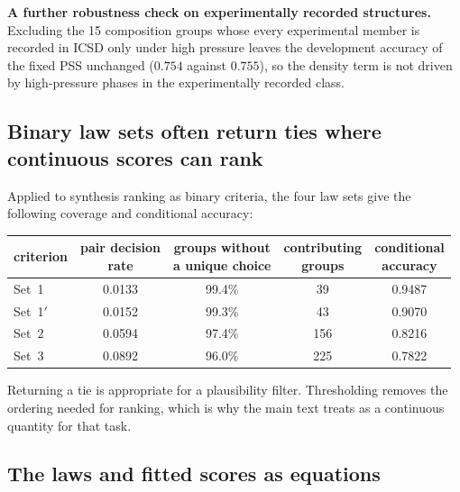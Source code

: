 \textbf{A further robustness check on experimentally recorded structures.} Excluding the 15
composition groups whose every experimental member is recorded in ICSD only
under high pressure leaves the development accuracy of the fixed PSS
unchanged ($0.754$ against $0.755$), so the density term is not driven by
high-pressure phases in the experimentally recorded class.

\subsection{Binary law sets often return ties where continuous scores can rank}

Applied to synthesis ranking as binary criteria, the four law sets give the following
coverage and conditional accuracy:

\begin{center}
\begin{tabular}{lcccc}
\hline
criterion & \shortstack{pair decision\\rate} & \shortstack{groups without\\a unique choice} &
\shortstack{contributing\\groups} & \shortstack{conditional\\accuracy} \\
\hline
Set~1 & 0.0133 & 99.4\% & 39 & 0.9487 \\
Set~1$'$ & 0.0152 & 99.3\% & 43 & 0.9070 \\
Set~2 & 0.0594 & 97.4\% & 156 & 0.8216 \\
Set~3 & 0.0892 & 96.0\% & 225 & 0.7822 \\
\hline
\end{tabular}
\end{center}

Returning a tie is appropriate for a plausibility filter. Thresholding removes the
ordering needed for ranking, which is why the main text treats \rhoc{} as a continuous
quantity for that task.

\subsection{The laws and fitted scores as equations}


